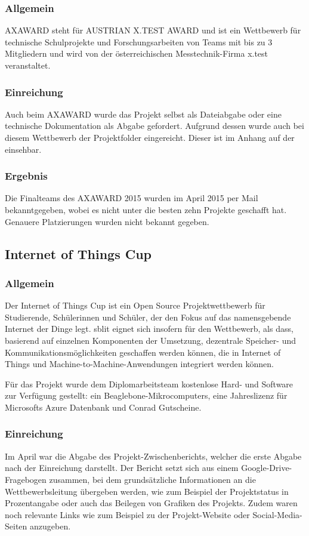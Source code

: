\subsubsection{Allgemein}
AXAWARD steht für AUSTRIAN X.TEST AWARD und ist ein Wettbewerb für technische Schulprojekte und Forschungsarbeiten
von Teams mit bis zu 3 Mitgliedern und wird von der österreichischen Messtechnik-Firma x.test veranstaltet.

\subsubsection{Einreichung}
Auch beim AXAWARD wurde das Projekt selbst als Dateiabgabe oder eine technische
Dokumentation als Abgabe gefordert. Aufgrund dessen wurde auch bei diesem Wettbewerb der Projektfolder eingereicht. Dieser ist im Anhang auf der  einsehbar.

\subsubsection{Ergebnis}
Die Finalteams des AXAWARD 2015 wurden im April 2015 per Mail bekanntgegeben, wobei es \sblit nicht
unter die besten zehn Projekte geschafft hat. Genauere Platzierungen wurden nicht bekannt gegeben.


\subsection{Internet of Things Cup}
\subsubsection{Allgemein}
Der Internet of Things Cup ist ein Open Source Projektwettbewerb für Studierende, Schülerinnen und Schüler,
der den Fokus auf das namensgebende Internet der Dinge legt. sblit eignet sich insofern für den Wettbewerb,
als dass, basierend auf einzelnen Komponenten der Umsetzung, dezentrale Speicher- und Kommunikationsmöglichkeiten
geschaffen werden können, die in Internet of Things und Machine-to-Machine-Anwendungen integriert werden können.

Für das Projekt wurde dem Diplomarbeitsteam kostenlose Hard- und Software zur Verfügung gestellt: ein
Beaglebone-Mikrocomputers, eine Jahreslizenz für Microsofts Azure Datenbank und Conrad Gutscheine.

\subsubsection{Einreichung}
Im April war die Abgabe des Projekt-Zwischenberichts, welcher die erste Abgabe nach
der Einreichung darstellt. Der Bericht setzt sich aus einem Google-Drive-Fragebogen
zusammen, bei dem grundsätzliche Informationen an die Wettbewerbsleitung übergeben
werden, wie zum Beispiel der Projektstatus in Prozentangabe oder auch das Beilegen
von Grafiken des Projekts. Zudem waren noch relevante Links wie zum Beispiel zu der
Projekt-Website oder Social-Media-Seiten anzugeben.


